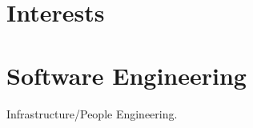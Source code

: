 \documentclass[]{deedy-resume-openfont}
\begin{document}
\begin{minipage}[t]{0.33	\textwidth}

\section{Interests}



\sectionsep


%
%

\end{minipage} 
\hfill
\begin{minipage}[t]{0.66\textwidth} 


\section{Software Engineering}

\sectionsep


\vspace{\topsep} %
\begin{tightemize}
\item Infrastructure/People Engineering.
\end{tightemize}
\sectionsep


\end{minipage}
\end{document}
